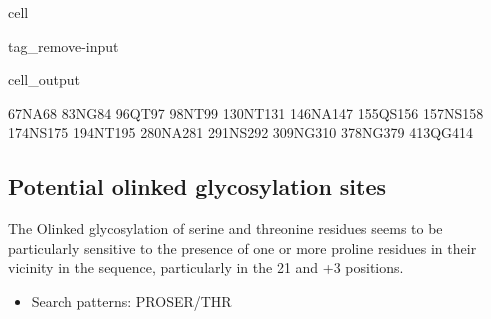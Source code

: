 \documentclass[letterpaper,10pt,english]{jupyterBook}
\begin{document}
\begin{sphinxuseclass}{cell}
\begin{sphinxuseclass}{tag_remove-input}\begin{sphinxVerbatimOutput}

\begin{sphinxuseclass}{cell_output}
\begin{sphinxVerbatim}[commandchars=\\\{\}]
67\PYGZhy{}NA\PYGZhy{}68
83\PYGZhy{}NG\PYGZhy{}84
96\PYGZhy{}QT\PYGZhy{}97
98\PYGZhy{}NT\PYGZhy{}99
130\PYGZhy{}NT\PYGZhy{}131
146\PYGZhy{}NA\PYGZhy{}147
155\PYGZhy{}QS\PYGZhy{}156
157\PYGZhy{}NS\PYGZhy{}158
174\PYGZhy{}NS\PYGZhy{}175
194\PYGZhy{}NT\PYGZhy{}195
280\PYGZhy{}NA\PYGZhy{}281
291\PYGZhy{}NS\PYGZhy{}292
309\PYGZhy{}NG\PYGZhy{}310
378\PYGZhy{}NG\PYGZhy{}379
413\PYGZhy{}QG\PYGZhy{}414
\end{sphinxVerbatim}

\end{sphinxuseclass}\end{sphinxVerbatimOutput}

\end{sphinxuseclass}
\end{sphinxuseclass}

\subsection{Potential o\sphinxhyphen{}linked glycosylation sites}
\label{\detokenize{ipynb/chapter1:potential-o-linked-glycosylation-sites}}
\sphinxAtStartPar
The O\sphinxhyphen{}linked glycosylation of serine and threonine residues seems to be particularly sensitive to the presence of one or more proline residues in their vicinity in the sequence, particularly in the 2\sphinxhyphen{}1 and +3 positions.
\begin{itemize}
\item {} 
\sphinxAtStartPar
Search patterns: PRO\sphinxhyphen{}SER/THR

\end{itemize}
\end{document}
